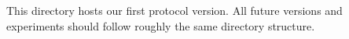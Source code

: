 This directory hosts our first protocol version. All future versions and experiments should follow roughly the same directory structure. 